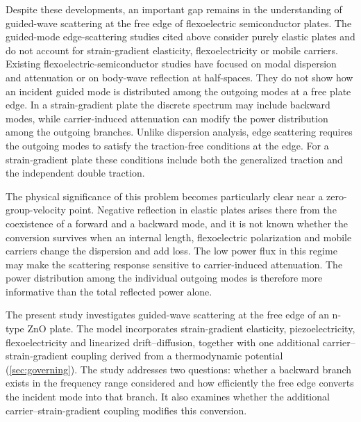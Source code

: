 Despite these developments, an important gap remains in the understanding of guided-wave scattering at the free edge of flexoelectric semiconductor plates.  The guided-mode edge-scattering studies cited above consider purely elastic plates and do not account for strain-gradient elasticity, flexoelectricity or mobile carriers.  Existing flexoelectric-semiconductor studies have focused on modal dispersion and attenuation or on body-wave reflection at half-spaces.  They do not show how an incident guided mode is distributed among the outgoing modes at a free plate edge.  In a strain-gradient plate the discrete spectrum may include backward modes, while carrier-induced attenuation can modify the power distribution among the outgoing branches.  Unlike dispersion analysis, edge scattering requires the outgoing modes to satisfy the traction-free conditions at the edge.  For a strain-gradient plate these conditions include both the generalized traction and the independent double traction.

The physical significance of this problem becomes particularly clear near a zero-group-velocity point.  Negative reflection in elastic plates arises there from the coexistence of a forward and a backward mode, and it is not known whether the conversion survives when an internal length, flexoelectric polarization and mobile carriers change the dispersion and add loss.  The low power flux in this regime may make the scattering response sensitive to carrier-induced attenuation.  The power distribution among the individual outgoing modes is therefore more informative than the total reflected power alone.

The present study investigates guided-wave scattering at the free edge of an n-type ZnO plate.  The model incorporates strain-gradient elasticity, piezoelectricity, flexoelectricity and linearized drift--diffusion, together with one additional carrier--strain-gradient coupling derived from a thermodynamic potential (\cref{sec:governing}).  The study addresses two questions: whether a backward branch exists in the frequency range considered and how efficiently the free edge converts the incident mode into that branch.  It also examines whether the additional carrier--strain-gradient coupling modifies this conversion.

